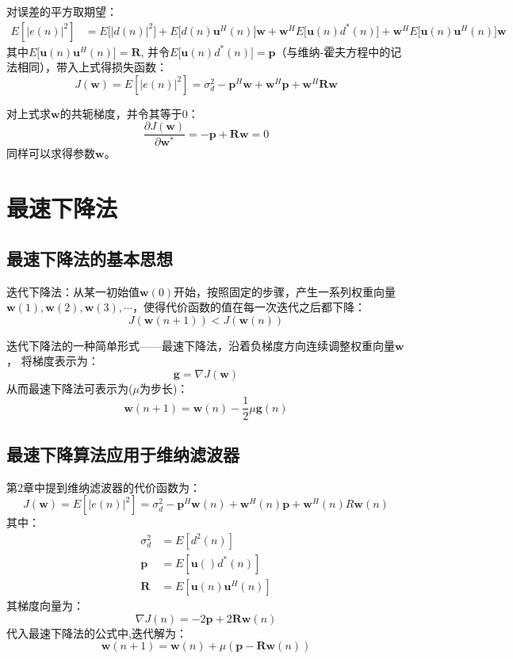\documentclass[UTF8]{ctexart} %
\begin{document}
			对误差的平方取期望：
			\[\begin{aligned}
			E[|e(n)|^2] & =  E\big[|d(n)|^2\big] + E\big[d(n)\textbf{u}^H(n)\big]\textbf{w} + \textbf{w}^HE\big[\textbf{u}(n)d^*(n)\big] + \textbf{w}^HE\big[\textbf{u}(n)\textbf{u}^H(n)\big]\textbf{w}
			\end{aligned}
			\]
			其中$E\big[\textbf{u}(n)\textbf{u}^H(n)\big] = \textbf{R}$, 并令$E\big[\textbf{u}(n)d^*(n)\big] =\textbf{p} $（与维纳-霍夫方程中的记法相同），带入上式得损失函数：
			\[J(\textbf{w}) = E[|e(n)|^2]  = \sigma_d^2 - \textbf{p}^H\textbf{w} + \textbf{w}^H\textbf{p} +\textbf{w}^H\textbf{Rw}\]
			
			对上式求$\textbf{w}$的共轭梯度，并令其等于0：
			\[\frac{\partial J(\textbf{w})}{\partial\textbf{w}^*} = -\textbf{p} + \textbf{R} \textbf{w}=0\]
			同样可以求得参数$\textbf{w}$。
	\section{最速下降法}
		\subsection{最速下降法的基本思想}
			迭代下降法：从某一初始值$\textbf{w}(0)$开始，按照固定的步骤，产生一系列权重向量$\textbf{w}(1),\textbf{w}(2),\textbf{w}(3),\cdots $，使得代价函数的值在每一次迭代之后都下降：
			\[J(\textbf{w}(n+1)) < J(\textbf{w}(n))\]
			
			迭代下降法的一种简单形式——最速下降法，沿着负梯度方向连续调整权重向量$\textbf{w}$，
			将梯度表示为：
			\[\textbf{g} = \nabla J(\textbf{w})\]
			从而最速下降法可表示为($\mu$为步长)：
			\[\textbf{w}(n+1) = \textbf{w}(n) -\frac{1}{2}\mu\textbf{g}(n)\]
		
		\subsection{最速下降算法应用于维纳滤波器}
			第2章中提到维纳滤波器的代价函数为：
			\[J(\textbf{w}) = E[|e(n)|^2]  = \sigma_d^2 - \textbf{p}^H\textbf{w}(n) + \textbf{w}^H(n)\textbf{p} +\textbf{w}^H(n)R\textbf{w}(n)\]
			其中：
			\[\begin{aligned}
			\sigma_d^2 &= E[d^2(n)]\\
			\textbf{p} &= E[\textbf{u}()d^*(n)]\\
			\textbf{R} &= E[\textbf{u}(n)\textbf{u}^H(n)]
			\end{aligned}\]
			其梯度向量为：
			\[\nabla J(n) = -2\textbf{p}+2\textbf{Rw}(n)\]
			代入最速下降法的公式中,迭代解为：
			\[\textbf{w}(n+1) = \textbf{w}(n) + \mu(\textbf{p}-\textbf{Rw}(n))\]
			
\end{document}
